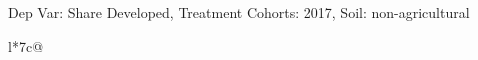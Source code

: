 \begin{table}[H]
\captionlistentry[table]{}
\label{table:beaver_land_class_DVis_land_class_3_SCg2_SSNAG}
\scriptsize %
Dep Var: Share Developed, Treatment Cohorts: 2017, Soil: non-agricultural \\
\begin{threeparttable}
\begin{tabulary}{\textwidth}{l*{7}{c}@{}}
\toprule \toprule
\noalign{\smallskip}
\noalign{\smallskip}
\midrule \bottomrule
\end{tabulary}
\medskip
\end{threeparttable}
\end{table}
